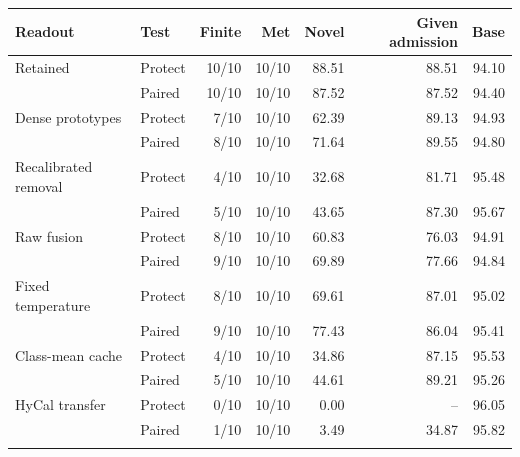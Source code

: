 \begin{tabular}{@{}llrrrrr@{}}
\toprule
Readout & Test & Finite & Met & Novel & Given admission & Base \\
\midrule
Retained & Protect & 10/10 & 10/10 & 88.51 & 88.51 & 94.10 \\
 & Paired & 10/10 & 10/10 & 87.52 & 87.52 & 94.40 \\
\addlinespace[2pt]
Dense prototypes & Protect & 7/10 & 10/10 & 62.39 & 89.13 & 94.93 \\
 & Paired & 8/10 & 10/10 & 71.64 & 89.55 & 94.80 \\
\addlinespace[2pt]
Recalibrated removal & Protect & 4/10 & 10/10 & 32.68 & 81.71 & 95.48 \\
 & Paired & 5/10 & 10/10 & 43.65 & 87.30 & 95.67 \\
\addlinespace[2pt]
Raw fusion & Protect & 8/10 & 10/10 & 60.83 & 76.03 & 94.91 \\
 & Paired & 9/10 & 10/10 & 69.89 & 77.66 & 94.84 \\
\addlinespace[2pt]
Fixed temperature & Protect & 8/10 & 10/10 & 69.61 & 87.01 & 95.02 \\
 & Paired & 9/10 & 10/10 & 77.43 & 86.04 & 95.41 \\
\addlinespace[2pt]
Class-mean cache & Protect & 4/10 & 10/10 & 34.86 & 87.15 & 95.53 \\
 & Paired & 5/10 & 10/10 & 44.61 & 89.21 & 95.26 \\
\addlinespace[2pt]
HyCal transfer & Protect & 0/10 & 10/10 & 0.00 & -- & 96.05 \\
 & Paired & 1/10 & 10/10 & 3.49 & 34.87 & 95.82 \\
\addlinespace[2pt]
\bottomrule
\end{tabular}
